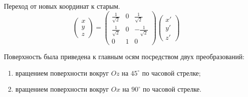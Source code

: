 Переход от новых координат к старым.
\[
  \begin{pmatrix} x \\ y \\ z \end{pmatrix} =
  \begin{pmatrix}
    \frac{1}{\sqrt{2}} & 0 & \frac{1}{\sqrt{2}} \\
    \frac{1}{\sqrt{2}} & 0 & -\frac{1}{\sqrt{2}} \\
    0 & 1 & 0
  \end{pmatrix}
  \begin{pmatrix}
    x' \\ y' \\ z'
  \end{pmatrix}
\]

Поверхность была приведена к главным осям посредством двух преобразований:
\begin{enumerate}
  \item вращением поверхности вокруг \(Oz\) на \(45^{\circ}\)
    по часовой стрелке;
  \item вращением поверхности вокруг \(Ox\) на \(90^{\circ}\)
    по часовой стрелке.
\end{enumerate}
